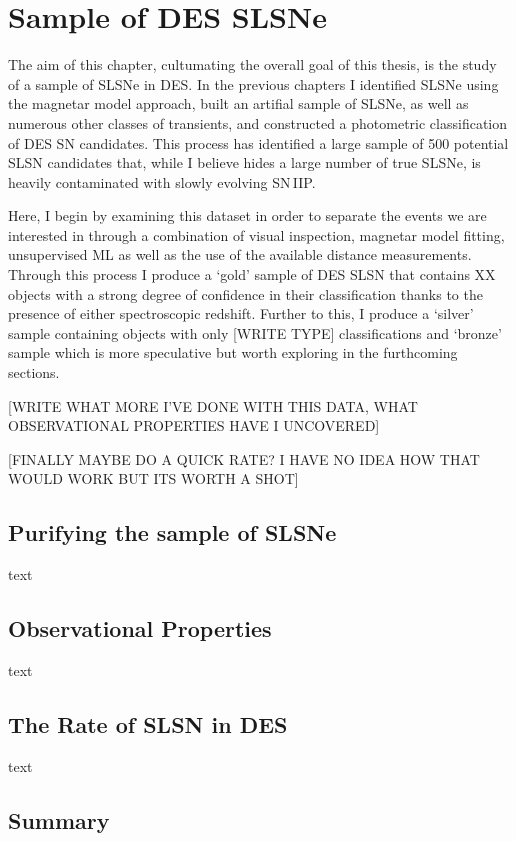 \chapter{Sample of DES SLSNe}
\label{Chapter6}

The aim of this chapter, cultumating the overall goal of this thesis, is the study of a sample of SLSNe in DES. In the previous chapters I identified SLSNe using the magnetar model approach, built an artifial sample of SLSNe, as well as numerous other classes of transients, and constructed a photometric classification of DES SN candidates. This process has identified a large sample of 500 potential SLSN candidates that, while I believe hides a large number of true SLSNe, is heavily contaminated with slowly evolving SN\,IIP.

Here, I begin by examining this dataset in order to separate the events we are interested in through a combination of visual inspection, magnetar model fitting, unsupervised ML as well as the use of the available distance measurements. Through this process I produce a `gold' sample of DES SLSN that contains XX objects with a strong degree of confidence in their classification thanks to the presence of either spectroscopic redshift. Further to this, I produce a `silver' sample containing objects with only [WRITE TYPE] classifications and `bronze' sample which is more speculative but worth exploring in the furthcoming sections.

[WRITE WHAT MORE I'VE DONE WITH THIS DATA, WHAT OBSERVATIONAL PROPERTIES HAVE I UNCOVERED]

[FINALLY MAYBE DO A QUICK RATE? I HAVE NO IDEA HOW THAT WOULD WORK BUT ITS WORTH A SHOT]

\section{Purifying the sample of SLSNe}
text

\section{Observational Properties}
text

\section{The Rate of SLSN in DES}
text

\section{Summary}

